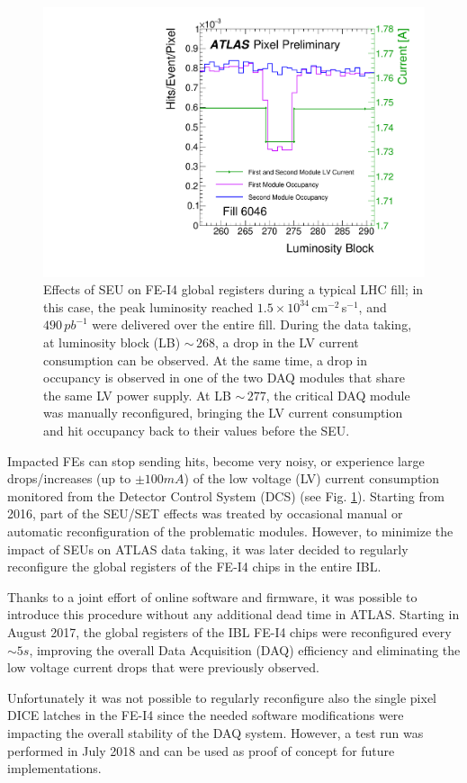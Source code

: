 \begin{figure}[h!]
\centering
\includegraphics[width=0.5\linewidth]{figures/ElectronicsChapter/ATLAS/SEU_Effects_GlobalReg.pdf}
\caption{Effects of SEU on FE-I4 global registers during a typical LHC fill; in this case, the peak luminosity reached $1.5 \times 10^{34}$\,cm$^{-2}$\,s$^{-1}$, and  $490\,pb^{-1}$ were delivered over the entire fill. During the data taking, at luminosity block (LB) $\sim\,268$, a drop in the LV current consumption can be observed. At the same time, a drop in occupancy is observed in one of the two DAQ modules that share the same LV power supply. At LB $\sim\,277$, the critical DAQ module was manually reconfigured, bringing the LV current consumption and hit occupancy back to their values before the SEU.}
\label{fig:SEUEffectsGlobal}
\end{figure}

Impacted FEs can stop sending hits, become very noisy, or experience large drops/increases (up to $\pm 100 mA$) of the low voltage (LV) current consumption monitored from the Detector Control System (DCS) (see Fig. \ref{fig:SEUEffectsGlobal}). 
Starting from 2016, part of the SEU/SET effects was treated by occasional manual or automatic reconfiguration of the problematic modules. However, to minimize the impact of SEUs on ATLAS data taking, it was later decided to regularly reconfigure the global registers of the FE-I4 chips in the entire IBL.

Thanks to a joint effort of online software and firmware, it was possible to introduce this procedure without any additional dead time in ATLAS. Starting in August 2017, the global registers of the IBL FE-I4 chips were reconfigured every $\sim 5 s $, improving the overall Data Acquisition (DAQ) efficiency and eliminating the low voltage current drops that were previously observed. 

Unfortunately it was not possible to regularly reconfigure also the single pixel DICE latches in the FE-I4 since the needed software modifications were impacting the overall stability of the DAQ system. However, a test run was performed in July 2018 and can be used as proof of concept for future implementations.

